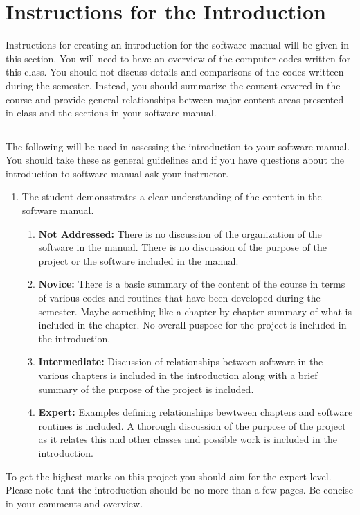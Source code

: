 
\section{\bf Instructions for the Introduction}

Instructions for creating an introduction for the software manual will be given
in this section. You will need to have an overview of the computer codes written
for this class. You should not discuss details and comparisons of the codes
writteen during the semester. Instead, you should summarize the content
covered in the course and provide general relationships between major content
areas presented in class and the sections in your software manual.

\vskip0.25in\hrule\vskip0.25in


The following will be used in assessing the introduction to your software
manual. You should take these as general guidelines and if you have questions
about the introduction to software manual ask your instructor.

\begin{enumerate}
  \item The student demonsstrates a clear understanding of the content in the
        software manual.
    \begin{enumerate}
      \item {\bf Not Addressed:} There is no discussion of the organization of
            the software in the manual. There is no discussion of the purpose of
            the project or the software included in the manual.
      \item {\bf Novice:}  There is a basic summary of the content of the course
            in terms of various codes and routines that have been developed
            during the semester. Maybe something like a chapter by chapter
            summary of what is included in the chapter. No overall puspose for
            the project is included in the introduction.
      \item {\bf Intermediate:} Discussion of relationships between software in
            the various chapters is included in the introduction along with a
            brief summary of the purpose of the project is included.
      \item {\bf Expert:} Examples defining relationships bewtween chapters and
            software routines is included. A thorough discussion of the purpose
            of the project as it relates this and other classes and possible
            work is included in the introduction.
    \end{enumerate}
\end{enumerate}

\noindent To get the highest marks on this project you should aim for the expert
level. Please note that the introduction should be no more than a few pages. Be
concise in your comments and overview.

\newpage
